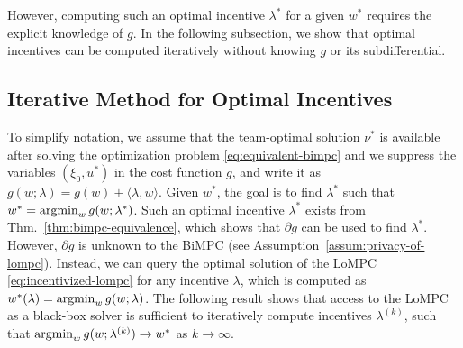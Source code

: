 %
%
%
%
However, computing such an optimal incentive $\lambda^*$ for a given $w^*$ requires the explicit knowledge of $g$.
In the following subsection, we show that optimal incentives can be computed iteratively without knowing $g$ or its subdifferential.


\subsection{Iterative Method for Optimal Incentives}
\label{subsec:iterative-method}

To simplify notation, we assume that the team-optimal solution $\nu^*$ is available after solving the optimization problem \eqref{eq:equivalent-bimpc} and we suppress the variables $(\xi_0, u^*)$ in the cost function $g$, and write it as $g(w; \lambda) = g(w) + \langle \lambda, w\rangle$.
Given $w^*$, the goal is to find $\lambda^*$ such that $w^* = \operatorname*{argmin}_w g(w; \lambda^*)$.
Such an optimal incentive $\lambda^*$ exists from Thm.~\ref{thm:bimpc-equivalence}, which shows that $\partial g$ can be used to find $\lambda^*$.
However, $\partial g$ is unknown to the BiMPC (see Assumption~\ref{assum:privacy-of-lompc}).
Instead, we can query the optimal solution of the LoMPC \eqref{eq:incentivized-lompc} for any incentive $\lambda$, which is computed as $w^*(\lambda) = \operatorname*{argmin}_w g(w; \lambda)$.
The following result shows that access to the LoMPC as a black-box solver is sufficient to iteratively compute incentives $\lambda^{(k)}$, such that $\operatorname*{argmin}_w g(w; \lambda^{(k)}) \rightarrow w^*$ as $k \rightarrow \infty$.

